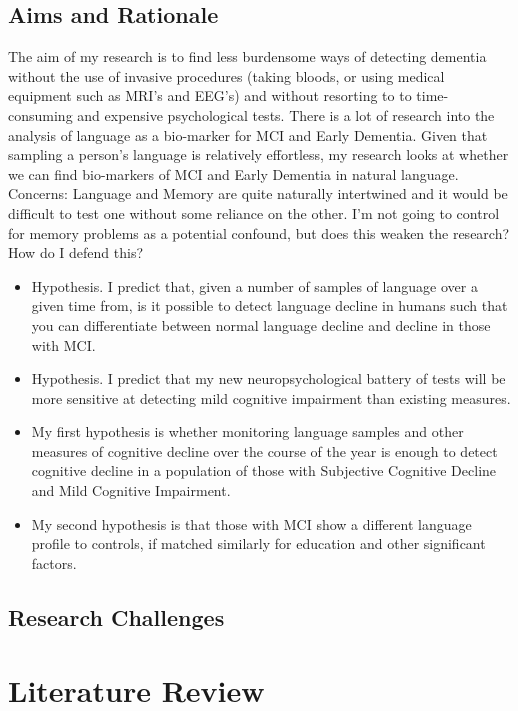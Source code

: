 \documentclass[12pt, twoside, a4paper]{article}
\begin{document}
\subsection{Aims and Rationale}
The aim of my research is to find less burdensome ways of detecting dementia without the use of invasive procedures (taking bloods, or using medical equipment such as MRI's and EEG's) and without resorting to to time-consuming and expensive psychological tests. There is a lot of research into the analysis of language as a bio-marker for MCI and Early Dementia. Given that sampling a person's language is relatively effortless, my research looks at whether we can find bio-markers of MCI and Early Dementia in natural language.\newline
Concerns: Language and Memory are quite naturally intertwined and it would be difficult to test one without some reliance on the other. I'm not going to control for memory problems as a potential confound, but does this weaken the research? How do I defend this? \newline
\begin{itemize}
	\item Hypothesis. I predict that, given a number of samples of language over a given time from, is it possible to detect language decline in humans such that you can differentiate between normal language decline and decline in those with MCI.
	\item Hypothesis. I predict that my new neuropsychological battery of tests will be more sensitive at detecting mild cognitive impairment than existing measures.
	\item My first hypothesis is whether monitoring language samples and other measures of cognitive decline over the course of the year is enough to detect cognitive decline in a population of those with Subjective Cognitive Decline and Mild Cognitive Impairment.
	\item My second hypothesis is that those with MCI show a different language profile to controls, if matched similarly for education and other significant factors.
\end{itemize}

\subsection{Research Challenges}
\section{Literature Review}
\end{document}
